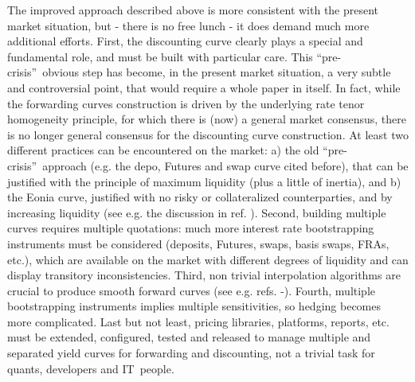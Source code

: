 \documentclass[11pt,reqno]{amsart}
\begin{document}
The improved approach described above is more consistent with the present market situation, but - there is no free lunch - it does demand much more additional efforts. First, the discounting curve clearly plays a special and fundamental role, and must be built with particular care. This \textquotedblleft pre-crisis\textquotedblright\ obvious step has become, in the present market situation, a very subtle and controversial point, that would require a whole paper in itself. In fact, while the forwarding curves construction is driven by the underlying rate tenor homogeneity principle, for which there is (now) a general market consensus, there is no longer general consensus for the discounting curve construction. At least two different practices can be encountered on the market: a) the old
\textquotedblleft pre-crisis\textquotedblright\ approach (e.g. the depo, Futures and swap curve cited before), that can be justified with the principle of maximum liquidity (plus a little of inertia), and b) the Eonia curve, justified with no risky or collateralized counterparties, and by increasing liquidity (see e.g. the discussion in ref. \cite{Mad08}).
Second, building multiple curves requires multiple quotations: much more interest rate bootstrapping instruments must be considered (deposits, Futures, swaps, basis swaps, FRAs, etc.), which are available on the market with different degrees of liquidity and can display transitory inconsistencies.
Third, non trivial interpolation algorithms are crucial to produce smooth forward curves (see e.g. refs. \cite{HagWes08}-\cite{And07}).
Fourth, multiple bootstrapping instruments implies multiple sensitivities, so hedging becomes more complicated. Last but not least, pricing libraries, platforms, reports, etc. must be extended, configured, tested and released to manage multiple and separated yield curves for forwarding and discounting, not a trivial task for quants, developers and IT\ people.
\end{document}
